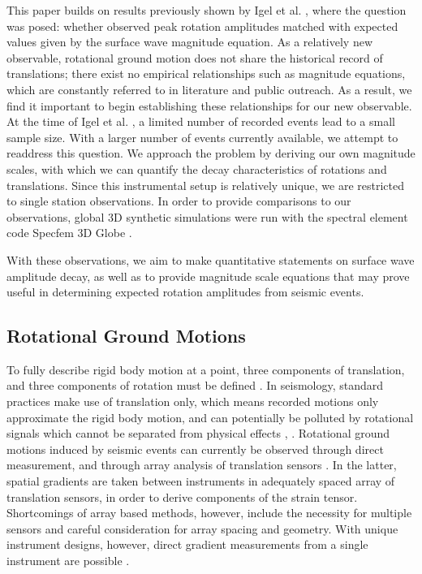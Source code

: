 \documentclass{gji}
\begin{document}
This paper builds on results previously shown by Igel et al. , 
where the question was posed: whether observed peak rotation amplitudes matched with expected values given by the surface wave magnitude equation. 
As a relatively new observable, rotational ground motion does not share the historical record of translations; there exist no empirical relationships such as magnitude equations, which are constantly referred to in literature and public outreach. As a result, we find it important to begin establishing these relationships for our new observable.
At the time of Igel et al. , a limited number of recorded events lead to a small sample size. With a larger number of events currently available, we attempt to readdress this question. We approach the problem by deriving our own magnitude scales, with which we can quantify the decay characteristics of rotations and translations. Since this instrumental setup is relatively unique, we are restricted to single station observations. In order to provide comparisons to our observations, global 3D synthetic simulations were run with the spectral element code Specfem 3D Globe \cite{komatitsch2002spectrala} \cite{komatitsch2002spectralb}. 

With these observations, we aim to make quantitative statements on surface wave amplitude decay, as well as to provide magnitude scale equations that may prove useful in determining expected rotation amplitudes from seismic events.

\subsection{Rotational Ground Motions}
To fully describe rigid body motion at a point, three components of translation, and three components of rotation must be defined \cite{stein2009introduction}. In seismology, standard practices make use of translation only, which means recorded motions only approximate the rigid body motion, and can potentially be polluted by rotational signals which cannot be separated from physical effects \cite{igel2005rotational}, \cite{aki2002quantitative}.  Rotational ground motions induced by seismic events can currently be observed through direct measurement, and through array analysis of translation sensors \cite{spudich1995transient}.
In the latter, spatial gradients are taken between instruments in adequately spaced array of translation sensors, in order to derive components of the strain tensor. Shortcomings of array based methods, however, include the necessity for multiple sensors and careful consideration for array spacing and geometry. With unique instrument designs, however, direct gradient measurements from a single instrument are possible \cite{schreiber2006ring}. %
\end{document}
